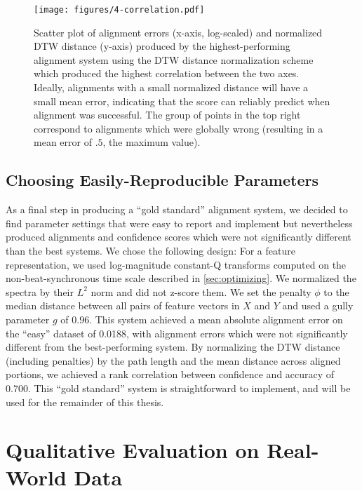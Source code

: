 \begin{figure}
  \centering
  \texttt{[image: figures/4-correlation.pdf]}
  \caption[Alignment errors and normalized DTW distances for the best-performing system]{Scatter plot of alignment errors (x-axis, log-scaled) and normalized DTW distance (y-axis) produced by the highest-performing alignment system using the DTW distance normalization scheme which produced the highest correlation between the two axes.
Ideally, alignments with a small normalized distance will have a small mean error, indicating that the score can reliably predict when alignment was successful.
The group of points in the top right correspond to alignments which were globally wrong (resulting in a mean error of $.5$, the maximum value).}
  \label{fig:correlation}
\end{figure}

\subsection{Choosing Easily-Reproducible Parameters}
\label{sec:goldstandard}

As a final step in producing a ``gold standard'' alignment system, we decided to find parameter settings that were easy to report and implement but nevertheless produced alignments and confidence scores which were not significantly different than the best systems.
We chose the following design: For a feature representation, we used log-magnitude constant-Q transforms computed on the non-beat-synchronous time scale described in \cref{sec:optimizing}.
We normalized the spectra by their $L^2$ norm and did not z-score them.
We set the penalty $\phi$ to the median distance between all pairs of feature vectors in $X$ and $Y$ and used a gully parameter $g$ of $0.96$.
This system achieved a mean absolute alignment error on the ``easy'' dataset of 0.0188, with alignment errors which were not significantly different from the best-performing system.
By normalizing the DTW distance (including penalties) by the path length and the mean distance across aligned portions, we achieved a rank correlation between confidence and accuracy of 0.700.
This ``gold standard'' system is straightforward to implement, and will be used for the remainder of this thesis.

\section{Qualitative Evaluation on Real-World Data}
\label{sec:qualitative}


